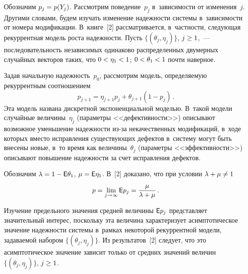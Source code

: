 \begin{multicols}{2}
Обозначим $p_j \hm= p(Y_j)$. Рассмотрим поведение~$p_j$
в~зависимости от изменения~$j$. Другими словами, будем изучать изменение
надежности системы в~зависимости от номера модификации.
В~книге~[2] рассматривается, в~частности, следующая рекуррентная модель
рос\-та надежности.  Пусть  $\{(\theta_j, \eta_j)\}$, $j\hm\ge1$,~---
последовательность независимых одинаково распределенных двумерных
случайных векторов таких, что $0 \hm< \eta_1 \hm< 1$; $0 \hm< \theta_1 \hm < 1$
почти наверное.

Задав начальную надежность~$p_0$, рассмотрим модель, определяемую рекуррентным
соотноше\-нием
$$p_{j+1} = \eta_{j+1}p_j + \theta_{j+1}(1-p_j)\,.$$
Эта модель названа дискретной экспоненциальной моделью.
В~такой модели случайные величины~$\eta_j$ (параметры <<дефективности>>)
описывают возможное уменьшение надежности из-за некачественных модификаций,
в~ходе которых вместо исправления существующих дефектов в~систему могут
быть внесены новые, в~то время как величины~$\theta_j$ (параметры <<эффективности>>)
описывают повышение надежности за счет исправления дефектов.

Обозначим $\lambda = 1 \hm- {\sf E}\theta_1$, $\mu  \hm= {\sf E}\eta_1$.
В~[2] доказано, что при условии $\lambda\hm+\mu\hm\neq1$
$$
p=\lim\limits_{j\to\infty}{\sf E} p_j = \displaystyle\frac{\displaystyle \mu\mathstrut}{\displaystyle \lambda+\mu\mathstrut}\,.
$$

Изучение предельного значения средней величины ${\sf E} p_j$ представляет
значительный интерес, поскольку эта величина характеризует асимптотическое
значение надежности системы в~рамках некото\-рой рекуррентной модели,
задаваемой набором $\{(\theta_j, \eta_j)\}$. Из результатов~[2] следует,
что это асимптотическое значение зависит только от средних значений величин
$\{(\theta_j, \eta_j)\}$, $j\hm\ge1$.


\end{multicols}
